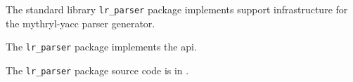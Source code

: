 
The standard library {\tt lr\_parser} package implements support infrastructure for the mythryl-yacc parser generator.

The {\tt lr\_parser} package implements the  api.

The {\tt lr\_parser} package source code is in .




